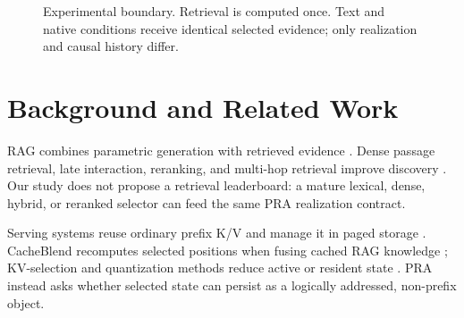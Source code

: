 \documentclass[11pt]{article}
\begin{document}
\begin{figure}[t]
\centering
{}
\caption{Experimental boundary. Retrieval is computed once. Text and native
conditions receive identical selected evidence; only realization and causal
history differ.}
\label{fig:architecture}
\end{figure}

\section{Background and Related Work}

RAG combines parametric generation with retrieved evidence
\cite{lewis2020rag}. Dense passage retrieval, late interaction, reranking, and
multi-hop retrieval improve discovery
\cite{karpukhin2020dpr,khattab2020colbert,trivedi2023ircot,xiong2021mdr}.
Our study does not propose a retrieval leaderboard: a mature lexical, dense,
hybrid, or reranked selector can feed the same PRA realization contract.

Serving systems reuse ordinary prefix K/V and manage it in paged storage
\cite{kwon2023vllm,gim2023promptcache}. CacheBlend recomputes selected positions
when fusing cached RAG knowledge \cite{yao2024cacheblend}; KV-selection and
quantization methods reduce active or resident state
\cite{zhang2023h2o,li2024snapkv,tang2024quest,liu2024kivi}. PRA instead asks
whether selected state can persist as a logically addressed, non-prefix object.
\end{document}
